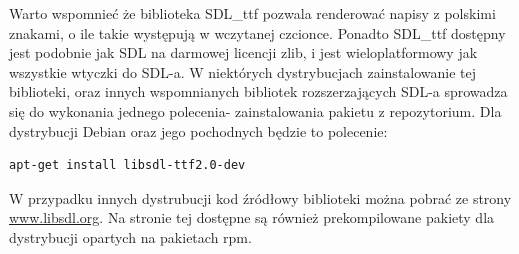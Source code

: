 Warto wspomnieć że biblioteka SDL\_ttf pozwala renderować napisy z polskimi znakami, o ile takie występują w wczytanej czcionce. Ponadto SDL\_ttf dostępny jest podobnie jak SDL na darmowej licencji zlib, i jest wieloplatformowy jak wszystkie wtyczki do SDL-a. W niektórych dystrybucjach zainstalowanie tej biblioteki, oraz innych wspomnianych bibliotek rozszerzających SDL-a sprowadza się do wykonania jednego polecenia- zainstalowania pakietu z repozytorium. Dla dystrybucji Debian oraz jego pochodnych będzie to polecenie:
\begin{verbatim}
apt-get install libsdl-ttf2.0-dev 
\end{verbatim}

W przypadku innych dystrubucji kod źródłowy biblioteki można pobrać ze strony
\href{http://www.libsdl.org/projects/SDL_ttf/}{www.libsdl.org}.
Na stronie tej dostępne są również prekompilowane pakiety dla dystrybucji opartych na pakietach rpm.